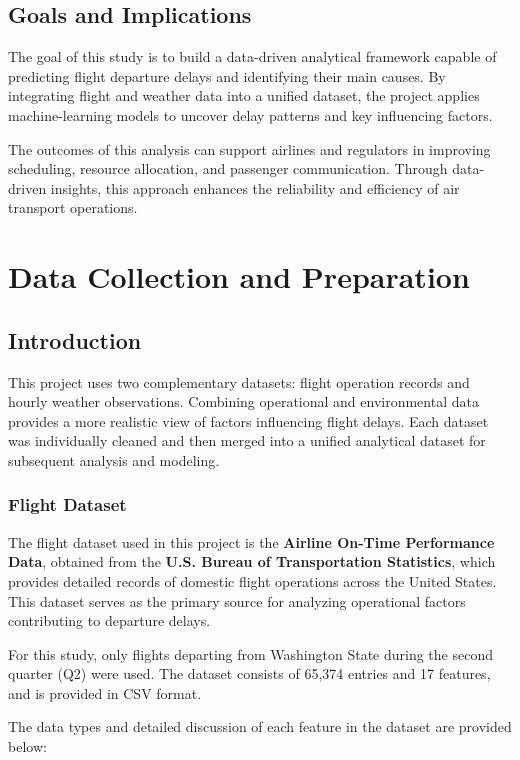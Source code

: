 \documentclass[a4paper,12pt]{report}
\begin{document}
\section{Goals and Implications}
The goal of this study is to build a data-driven analytical framework capable of predicting flight departure delays and identifying their main causes. By integrating flight and weather data into a unified dataset, the project applies machine-learning models to uncover delay patterns and key influencing factors. 

The outcomes of this analysis can support airlines and regulators in improving scheduling, resource allocation, and passenger communication. Through data-driven insights, this approach enhances the reliability and efficiency of air transport operations.


\chapter{Data Collection and Preparation}
\section{Introduction}
This project uses two complementary datasets: flight operation records and hourly weather observations. Combining operational and environmental data provides a more realistic view of factors influencing flight delays. Each dataset was individually cleaned and then merged into a unified analytical dataset for subsequent analysis and modeling.
\subsection{Flight Dataset}
The flight dataset used in this project is the \textbf{Airline On-Time Performance Data}, obtained from the \textbf{U.S. Bureau of Transportation Statistics}, which provides detailed records of domestic flight operations across the United States. This dataset serves as the primary source for analyzing operational factors contributing to departure delays.

For this study, only flights departing from Washington State during the second quarter (Q2) were used.
The dataset consists of 65,374 entries and 17 features, and is provided in CSV format.

The data types and detailed discussion of each feature in the dataset are provided below:
\end{document}

